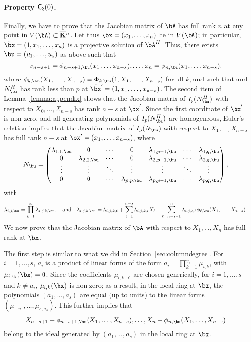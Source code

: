 \documentclass[12pt]{article}
\begin{document}
\paragraph{Property $\mathsf{C}_3(0)$.} Finally, we have to prove that the Jacobian
matrix of $\bA$ has full rank $n$ at any point in $V(\bA) \subset
\KKbar{}^n$. Let thus $\bx=(x_1,\dots,x_n)$ be in $V(\bA)$; in
particular, $\tilde \bx=(1,x_1,\dots,x_n)$ is a projective solution of
$\bA^H$.  Thus, there exists $\bu=(u_1,\dots,u_s)$ as above such that
$$x_{n-s+1}=\phi_{n-s+1,\bu}(x_1\dots,x_{n-s}),\dots,x_{n}=\phi_{n,\bu}(x_1,\dots,x_{n-s}),$$
where $\phi_{k,\bu}(X_1,\dots,X_{n-s})=\Phi_{k,\bu}(1,X_1,\dots,X_{n-s})$ for 
all $k$, and such that
and $\mN^H_\bu$ has rank less than $p$ at $\tilde\bx'=(1,x_1,\dots,x_{n-s})$.  The second item of
Lemma~\ref{lemma:appendix} shows that the Jacobian matrix of
$I_p(\mN^H_\bu)$ with respect to $X_0,\dots,X_{n-s}$ has rank $n-s$
at $\tilde \bx'$. Since the first coordinate of $\tilde\bx'$ is non-zero,
and all generating polynomials of $I_p(\mN^H_\bu)$ are homogeneous,
Euler's relation implies that the Jacobian matrix of $I_p(\mN_\bu)$
with respect to $X_1,\dots,X_{n-s}$
has full rank $n-s$ at $\bx'=(x_1,\dots,x_{n-s})$, where  
\begin{align}\label{eqdef:Lu}
 \mN_\bu = \left( \begin{matrix}
\lambda_{1,1,\bu} & 0 & \cdots & 0 & \lambda_{1,p+1,\bu} & \cdots & \lambda_{1, q,\bu}\\
0 & \lambda_{2,2,\bu} & \cdots & 0 & \lambda_{2,p+1,\bu} & \cdots & \lambda_{2, q,\bu}\\
\vdots & \vdots & \ddots & \vdots & \vdots & \ddots & \vdots\\
0 & 0 & \cdots & \lambda_{p,p,\bu} & \lambda_{p,p+1,\bu} & \cdots & \lambda_{p, q,\bu}
\end{matrix} \right),
\end{align}
with
$$\lambda_{i,j,\bu}=\prod_{k=1}^{\alpha_i}\lambda_{i,j,k,\bu},
\quad\text{and}\quad \lambda_{i,j,k,\bu}=\lambda_{i,j,k,0}+\sum_{\ell
  = 1}^{n-s}\lambda_{i,j,k,\ell}X_\ell + \sum_{\ell =
  n-s+1}^{n}\lambda_{i,j,k,\ell}
\phi_{\ell,\bu}(X_1,\dots,X_{n-s}).$$ We now prove
that the Jacobian matrix of $\bA$ with respect to $X_1,\dots,X_n$ has
full rank at $\bx$.

The first step is similar to what we did in Section~\ref{sec:columndegree}.  For
$i=1,\dots,s$, $a_i$ is a product of linear forms of the form
$a_i=\prod_{k=1}^{\gamma_i} \mu_{i,k}$, with $\mu_{i,u_i}(\bx)=0$.
Since the coefficients $\mu_{i,k,\ell}$ are chosen generically, for
$i=1,\dots,s$ and $k \ne u_i$, $\mu_{i,k}(\bx)$ is non-zero; as a
result, in the local ring at $\bx$, the polynomials $(a_1,\dots,a_s)$
are equal (up to units) to the linear forms
$(\mu_{1,u_1},\dots,\mu_{s,u_s})$. This further implies that
\begin{align}\label{eq:subst}
X_{n-s+1}-\phi_{n-s+1,\bu}(X_1,\dots,X_{n-s}),\dots,X_{n}-\phi_{n,\bu}(X_1,\dots,X_{n-s})
\end{align}
belong to the ideal generated by $(a_1,\dots,a_s)$ in the local 
ring at $\bx$.
\end{document}
